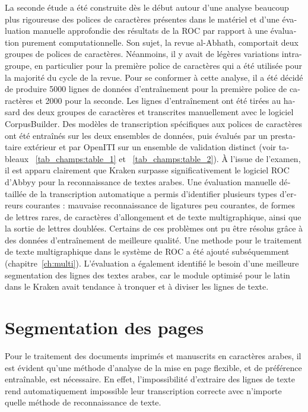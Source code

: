 \begin{french}
La seconde étude a été construite dès le début autour d'une analyse beaucoup
plus rigoureuse des polices de caractères présentes dans le matériel et d'une
évaluation manuelle approfondie des résultats de la ROC par rapport à une
évaluation purement computationnelle. Son sujet, la revue al-Abhath, comportait deux groupes 
de polices de caractères. Néanmoins, il y avait
de légères variations intra-groupe, en particulier pour la première police de
caractères qui a été utilisée pour la majorité du cycle de la revue. Pour se
conformer à cette analyse, il a été décidé de produire 5000 lignes de données
d'entraînement pour la première police de caractères et 2000 pour la seconde.
Les lignes d'entraînement ont été tirées au hasard des deux groupes de
caractères et transcrites manuellement avec le logiciel CorpusBuilder. Des
modèles de transcription spécifiques aux polices de caractères ont été
entraînés sur les deux ensembles de données, puis évalués par un prestataire
extérieur et par OpenITI sur un ensemble de validation distinct (voir tableaux
~\ref{tab_champs:table_1} et ~\ref{tab_champs:table_2}). À l'issue de l'examen,
il est apparu clairement que Kraken surpasse significativement le logiciel ROC
d'Abbyy pour la reconnaissance de textes arabes. Une évaluation manuelle
détaillée de la transcription automatique a permis d'identifier plusieurs types
d'erreurs courantes : mauvaise reconnaissance de ligatures peu courantes, de
formes de lettres rares, de caractères d'allongement et de texte multigraphique, ainsi que 
la sortie de lettres doublées. Certains de ces problèmes ont pu être résolus
grâce à des données d'entraînement de meilleure qualité. Une methode pour le
traitement de texte multigraphique dans le système de ROC a été ajouté
subséquemment (chapitre~\ref{ch:multi}). L'évaluation a également identifié le
besoin d'une meilleure segmentation des lignes des textes arabes, car le module
optimisé pour le latin dans le Kraken avait tendance à tronquer et à diviser
les lignes de texte.

\section{Segmentation des pages}

Pour le traitement des documents imprimés et manuscrits en caractères arabes,
il est évident qu'une méthode d'analyse de la mise en page flexible, et de
préférence entraînable, est nécessaire. En effet, l'impossibilité d'extraire des
lignes de texte rend automatiquement impossible leur transcription correcte
avec n'importe quelle méthode de reconnaissance de texte.


\end{french}

